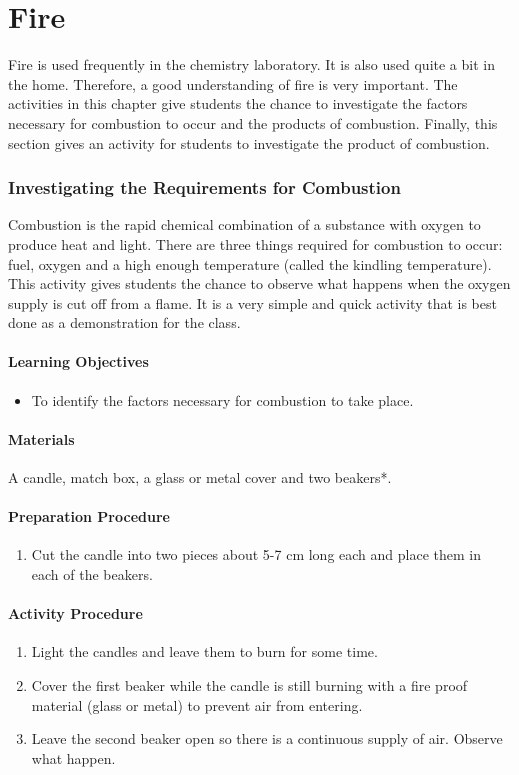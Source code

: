 \chapter{Fire}
Fire is used frequently in the chemistry laboratory. It is also used quite a bit in the home. Therefore, a good understanding of fire is very important.
The activities in this chapter give students the chance to investigate the factors necessary for combustion to occur and the products of combustion. Finally, this section gives an activity for students to investigate the product of combustion.

\subsection{Investigating the Requirements for Combustion}
Combustion is the rapid chemical combination of a substance with oxygen to produce heat and light. There are three things required for combustion to occur: fuel, oxygen and a high enough temperature (called the kindling temperature). This activity gives students the chance to observe what happens when the oxygen supply is cut off from a flame. It is a very simple and quick activity that is best done as a demonstration for the class.
\subsubsection*{Learning Objectives}
\begin{itemize}
\item{To identify the factors necessary for combustion to take place.}
\end{itemize}

\subsubsection*{Materials}
A candle, match box, a glass or metal cover and two beakers*.

\subsubsection*{Preparation Procedure}
\begin{enumerate}
\item{Cut the candle into two pieces about 5-7 cm long each and place them in each of the beakers.}
\end{enumerate}

\subsubsection*{Activity Procedure}
\begin{enumerate}
\item{Light the candles and leave them to burn for some time.}
\item{Cover the first beaker while the candle is still burning with a fire proof material (glass or metal) to prevent air from entering.}
\item{Leave the second beaker open so there is a continuous supply of air. Observe what happen.}
\end{enumerate}

